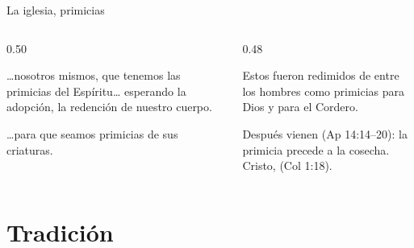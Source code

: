 \begin{frame}{La iglesia, primicias}
\begin{columns}[t,onlytextwidth]
\begin{column}{0.50\textwidth}
\begin{cita}\ldots{}nosotros mismos, que tenemos las primicias del Espíritu\ldots{} esperando la adopción, la redención de nuestro cuerpo.\end{cita}
\begin{cita}\ldots{}para que seamos primicias de sus criaturas.\end{cita}
\end{column}
\begin{column}{0.48\textwidth}
\begin{cita}Estos fueron redimidos de entre los hombres como primicias para Dios y para el Cordero.\end{cita}
\scriptsize\RaggedRight Después vienen  (Ap 14:14--20): la primicia precede a la cosecha. Cristo,  (Col 1:18).\par\smallskip
{}
\end{column}
\end{columns}
\end{frame}

\section{Tradición}

